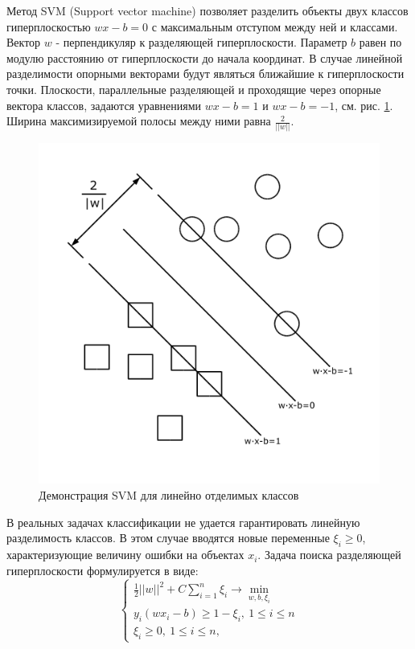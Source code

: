\documentclass[14pt]{extarticle}
\begin{document}
\par
Метод SVM (Support vector machine) позволяет разделить объекты двух классов
гиперплоскостью $wx-b=0$ с максимальным отступом между ней и классами.
Вектор $w$ - перпендикуляр к разделяющей гиперплоскости.
Параметр $b$ равен по модулю расстоянию от гиперплоскости до начала координат.
В случае линейной разделимости опорными векторами будут являться ближайшие
к гиперплоскости точки.
Плоскости, параллельные разделяющей и проходящие через опорные вектора классов,
задаются уравнениями $wx-b=1$ и $wx-b=-1$, см. рис. \ref{image:svm_linear}.
Ширина максимизируемой полосы между ними равна $\frac{2}{||w||}.$
\begin{figure}[H]
\centering
\includegraphics[width=\linewidth]{imgs/svm_linear.png}
\caption{Демонстрация SVM для линейно отделимых классов}
\label{image:svm_linear}
\end{figure}
\par
В реальных задачах классификации не удается гарантировать линейную разделимость классов.
В этом случае вводятся новые переменные $\xi_i \ge 0$, характеризующие величину ошибки 
на объектах $x_i$. Задача поиска разделяющей гиперплоскости формулируется в виде:
\[\begin{cases}
    \frac{1}{2}||w||^2+C\sum_{i=1}^n\xi_i \to \min_{w, b, \xi_i} \\
    y_i(wx_i-b)\ge 1-\xi_i,\ 1 \le i \le n \\
    \xi_i \ge 0,\ 1 \le i \le n,
\end{cases}\]
\end{document}
